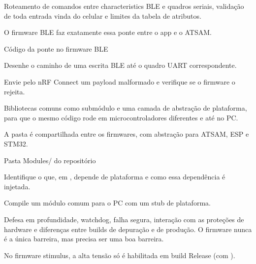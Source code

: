 Roteamento de comandos entre characteristics BLE e quadros seriais, validação de toda entrada vinda do celular e limites da tabela de atributos.

\begin{noproduto}
O firmware BLE faz exatamente essa ponte entre o app e o ATSAM.
\end{noproduto}

\begin{paraestudar}
  \item Código da ponte no firmware BLE
\end{paraestudar}

\begin{pratique}
  \item Desenhe o caminho de uma escrita BLE até o quadro UART correspondente.
  \item Envie pelo nRF Connect um payload malformado e verifique se o firmware o rejeita.
\end{pratique}

Bibliotecas comuns como submódulo e uma camada de abstração de plataforma, para que o mesmo código rode em microcontroladores diferentes e até no PC.

\begin{noproduto}
A pasta  é compartilhada entre os firmwares, com abstração para ATSAM, ESP e STM32.
\end{noproduto}

\begin{paraestudar}
  \item Pasta Modules/ do repositório
\end{paraestudar}

\begin{pratique}
  \item Identifique o que, em , depende de plataforma e como essa dependência é injetada.
  \item Compile um módulo comum para o PC com um stub de plataforma.
\end{pratique}

Defesa em profundidade, watchdog, falha segura, interação com as proteções de hardware e diferenças entre builds de depuração e de produção. O firmware nunca é a única barreira, mas precisa ser uma boa barreira.

\begin{noproduto}
No firmware stimulus, a alta tensão só é habilitada em build Release (com ).
\end{noproduto}

